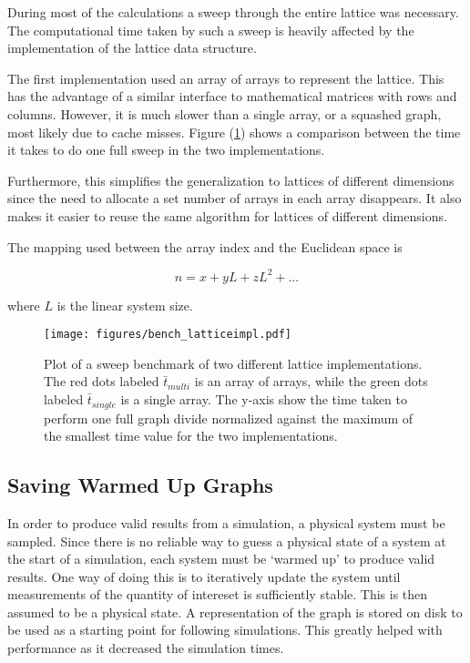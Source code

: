 During most of the calculations a sweep through the entire lattice was necessary. The computational time taken by such a sweep is heavily affected by the implementation of the lattice data structure.

The first implementation used an array of arrays to represent the lattice. This has the advantage of a similar interface to mathematical matrices with rows and columns. However, it is much slower than a single array, or a squashed graph, most likely due to cache misses\cite{Hanlon:CacheMisses}. Figure (\ref{fig:bench_latticeimpl}) shows a comparison between the time it takes to do one full sweep in the two implementations.

Furthermore, this simplifies the generalization to lattices of different dimensions since the need to allocate a set number of arrays in each array disappears. It also makes it easier to reuse the same algorithm for lattices of different dimensions.

The mapping used between the array index and the Euclidean space is

\begin{equation}
    n = x + y L + z L^2 + ...
\end{equation}

\noindent where $L$ is the linear system size.

\begin{figure}[h!]
    \centering
        \texttt{[image: figures/bench\_latticeimpl.pdf]}
    \caption{Plot of a sweep benchmark of two different lattice implementations. The red dots labeled $\bar t_{multi}$ is an array of arrays, while the green dots labeled $\bar t_{single}$ is a single array. The y-axis show the time taken to perform one full graph divide normalized against the maximum of the smallest time value for the two implementations.}
    \label{fig:bench_latticeimpl}
\end{figure}

\subsection{Saving Warmed Up Graphs}
\label{subsec:SavingWarmedUpGraphs}

In order to produce valid results from a simulation, a physical system must be sampled. Since there is no reliable way to guess a physical state of a system at the start of a simulation, each system must be `warmed up' to produce valid results. One way of doing this is to iteratively update the system until measurements of the quantity of intereset is sufficiently stable. This is then assumed to be a physical state. A representation of the graph is stored on disk to be used as a starting point for following simulations. This greatly helped with performance as it decreased the simulation times.

